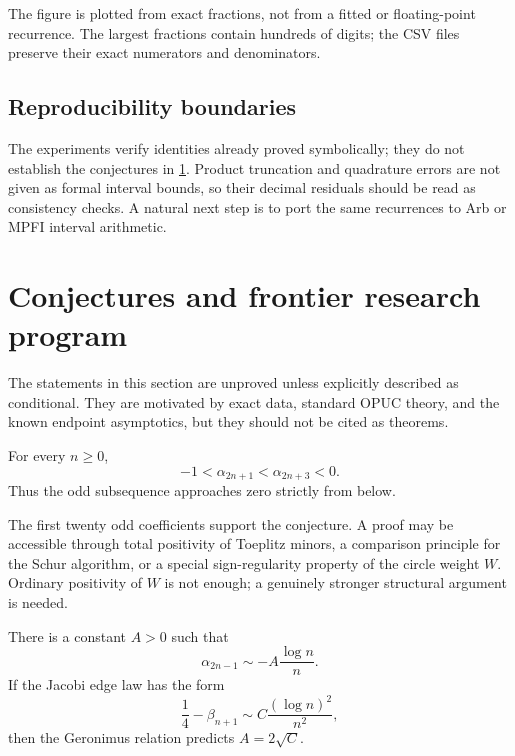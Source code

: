 \documentclass[11pt]{article}
\theoremstyle{definition}
\theoremstyle{remark}
\begin{document}
The figure is plotted from exact fractions, not from a fitted or floating-point recurrence.
The largest fractions contain hundreds of digits; the CSV files preserve their exact
numerators and denominators.

\subsection{Reproducibility boundaries}

The experiments verify identities already proved symbolically; they do not establish the
conjectures in \cref{p7:sec:conjectures}. Product truncation and quadrature errors are not given
as formal interval bounds, so their decimal residuals should be read as consistency checks.
A natural next step is to port the same recurrences to Arb or MPFI interval arithmetic.

\section{Conjectures and frontier research program}
\label{p7:sec:conjectures}

\begin{conjecturebox}
The statements in this section are unproved unless explicitly described as conditional.
They are motivated by exact data, standard OPUC theory, and the known endpoint asymptotics,
but they should not be cited as theorems.
\end{conjecturebox}

\begin{conjecture}
\label{p7:conj:alpha-monotone}
For every \(n\ge0\),
\begin{equation}
 -1<\alpha_{2n+1}<\alpha_{2n+3}<0.
 \label{p7:eq:conj-alpha-monotone}
\end{equation}
Thus the odd subsequence approaches zero strictly from below.
\end{conjecture}

The first twenty odd coefficients support the conjecture. A proof may be accessible through
total positivity of Toeplitz minors, a comparison principle for the Schur algorithm, or a
special sign-regularity property of the circle weight \(W\). Ordinary positivity of \(W\) is
not enough; a genuinely stronger structural argument is needed.

\begin{conjecture}
\label{p7:conj:alpha-asymptotic}
There is a constant \(A>0\) such that
\begin{equation}
 \alpha_{2n-1}\sim-A\frac{\log n}{n}.
 \label{p7:eq:alpha-asymptotic}
\end{equation}
If the Jacobi edge law has the form
\begin{equation}
 \frac14-\beta_{n+1}\sim C\frac{(\log n)^2}{n^2},
 \label{p7:eq:beta-edge-conj}
\end{equation}
then the Geronimus relation predicts \(A=2\sqrt C\).
\end{conjecture}
\end{document}
